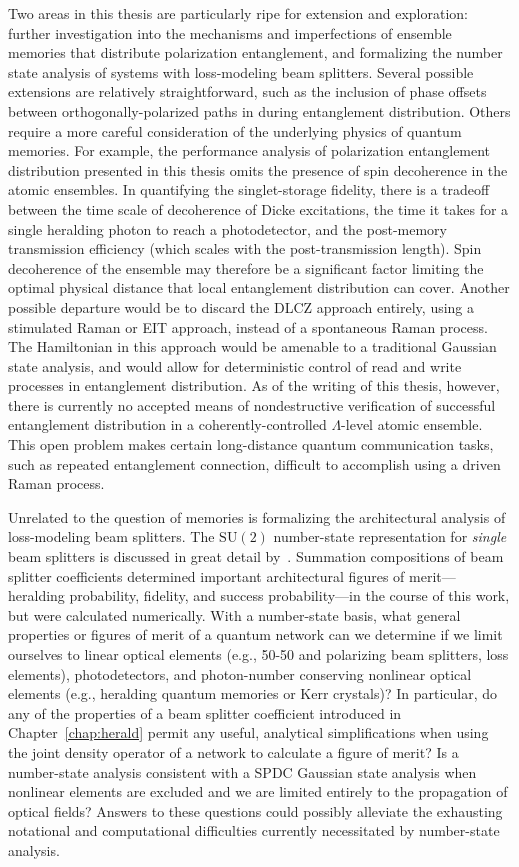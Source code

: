 \documentclass[aps,twocolumn,secnumarabic,amsmath,amssymb,pra,groupedaddress,
showpacs, showkeys]{revtex4-1}
\newcommand{\pna}[1]{\left(#1\right)}
\begin{document}
Two areas in this thesis are particularly ripe for extension and exploration:
further investigation into the mechanisms and imperfections of ensemble
memories that distribute polarization entanglement, and formalizing the number
state analysis of systems with loss-modeling beam splitters. Several possible
extensions are relatively straightforward, such as the inclusion of phase
offsets between orthogonally-polarized paths in during entanglement
distribution. Others require a more careful consideration of the underlying
physics of quantum memories. For example, the performance analysis of
polarization entanglement distribution presented in this thesis omits the
presence of spin decoherence in the atomic ensembles. In quantifying the
singlet-storage fidelity, there is a tradeoff between the time scale of
decoherence of Dicke excitations, the time it takes for a single heralding
photon to reach a photodetector, and the post-memory transmission efficiency
(which scales with the post-transmission length). Spin decoherence of the
ensemble may therefore be a significant factor limiting the optimal physical
distance that local entanglement distribution can cover. Another possible
departure would be to discard the DLCZ approach entirely, using a stimulated
Raman or EIT approach, instead of a spontaneous Raman process. The Hamiltonian
in this approach would be amenable to a traditional Gaussian state analysis,
and would allow for deterministic control of read and write processes in
entanglement distribution. As of the writing of this thesis, however, there is
currently no accepted means of nondestructive verification of successful
entanglement distribution in a coherently-controlled $\Lambda$-level atomic
ensemble. This open problem makes certain long-distance quantum communication
tasks, such as repeated entanglement connection, difficult to accomplish using
a driven Raman process.

Unrelated to the question of memories is formalizing the architectural analysis
of loss-modeling beam splitters. The $\textrm{SU}\pna{2}$ number-state
representation for \emph{single} beam splitters is discussed in great detail
by~\cite{PhysRevA.40.1371}. Summation compositions of beam splitter
coefficients determined important architectural figures of merit---heralding
probability, fidelity, and success probability---in the course of this work,
but were calculated numerically. With a number-state basis, what general
properties or figures of merit of a quantum network can we determine if we
limit ourselves to linear optical elements (e.g., 50-50 and polarizing beam
splitters, loss elements), photodetectors, and photon-number conserving
nonlinear optical elements (e.g., heralding quantum memories or Kerr crystals)?
In particular, do any of the properties of a beam splitter coefficient
introduced in Chapter~\ref{chap:herald} permit any useful, analytical
simplifications when using the joint density operator of a network to calculate
a figure of merit? Is a number-state analysis consistent with a SPDC Gaussian
state analysis when nonlinear elements are excluded and we are limited entirely
to the propagation of optical fields? Answers to these questions could possibly
alleviate the exhausting notational and computational difficulties currently
necessitated by number-state analysis.
\end{document}

